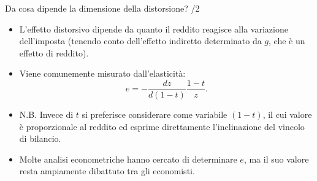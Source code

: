 \documentclass[aspectratio=64,12pt]{beamer}
\begin{document}
\begin{frame}{Da cosa dipende la dimensione della distorsione? /2}
\begin{itemize}
\item L'effetto distorsivo dipende da quanto il reddito reagisce alla
  variazione dell'imposta (tenendo conto dell'effetto indiretto determinato da
  $g$, che è un effetto di reddito).
\item Viene comunemente misurato dall'elasticità:
  \begin{equation*}
 e = -\dfrac{dz}{d(1-t)}\dfrac{1-t}{z}.
\end{equation*}

\item N.B. Invece di $t$ si preferisce considerare come variabile $(1-t)$, il
  cui valore è proporzionale al reddito ed esprime direttamente l'inclinazione
  del vincolo di bilancio.
\item Molte analisi econometriche hanno cercato di determinare $e$, ma il suo
  valore resta ampiamente dibattuto tra gli economisti.
\end{itemize}
\end{frame}
\end{document}
